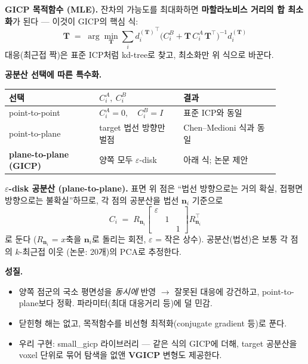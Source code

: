 \textbf{GICP 목적함수 (MLE).} 잔차의 가능도를 최대화하면 \textbf{마할라노비스
거리의 합 최소화}가 된다 --- 이것이 GICP의 핵심 식:
\begin{equation*}
  \mathbf{T} \;=\; \arg\min_{\mathbf{T}} \sum_i
  {d_i^{(\mathbf{T})}}^{\top}
  \big( C_i^B + \mathbf{T}\, C_i^A\, \mathbf{T}^{\top} \big)^{-1}
  d_i^{(\mathbf{T})}
\end{equation*}
대응(최근접 짝)은 표준 ICP처럼 kd-tree로 찾고, 최소화만 위 식으로 바꾼다.

\textbf{공분산 선택에 따른 특수화.}
\begin{longtable}{p{0.30\linewidth}p{0.28\linewidth}p{0.32\linewidth}}
\toprule
\textbf{선택} & \textbf{$C_i^A,\ C_i^B$} & \textbf{결과} \\
\midrule
point-to-point & $C_i^A=0,\quad C_i^B=I$ & 표준 ICP와 동일 \\
point-to-plane & target 법선 방향만 벌점 & Chen--Medioni 식과 동일 \\
\textbf{plane-to-plane (GICP)} & 양쪽 모두 $\varepsilon$-disk & 아래 식;
  논문 제안 \\
\bottomrule
\end{longtable}

\textbf{$\varepsilon$-disk 공분산 (plane-to-plane).} 표면 위 점은 ``법선
방향으로는 거의 확실, 접평면 방향으로는 불확실''하므로, 각 점의 공분산을 법선
$\mathbf{n}_i$ 기준으로
\begin{equation*}
  C_i \;=\; R_{\mathbf{n}_i}
  \begin{bmatrix} \varepsilon & & \\ & 1 & \\ & & 1 \end{bmatrix}
  R_{\mathbf{n}_i}^{\top}
\end{equation*}
로 둔다 ($R_{\mathbf{n}_i}$ = $x$축을 $\mathbf{n}_i$로 돌리는 회전,
$\varepsilon$ = 작은 상수). 공분산(법선)은 보통 각 점의 $k$-최근접 이웃
(논문: 20개)의 PCA로 추정한다.

\textbf{성질.}
\begin{itemize}
  \item 양쪽 점군의 국소 평면성을 \emph{동시에} 반영 $\to$ 잘못된 대응에
  강건하고, point-to-plane보다 정확. 파라미터(최대 대응거리 등)에 덜 민감.
  \item 닫힌형 해는 없고, 목적함수를 비선형 최적화(conjugate gradient 등)로
  푼다.
  \item 우리 구현: small\_gicp 라이브러리 --- 같은 식의 GICP에 더해, target
  공분산을 voxel 단위로 묶어 탐색을 없앤 \textbf{VGICP} 변형도 제공한다.
\end{itemize}


